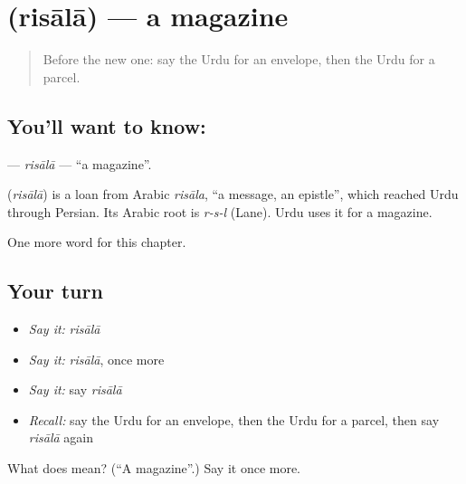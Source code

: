 \section[\texorpdfstring{\ur{رسالہ} (risālā)}{رسالہ (risālā)}]{ (risālā) — a magazine}

\label{lesson:UR-C225-risala}



\begin{quote}
Before the new one: say the Urdu for an envelope, then the Urdu for a parcel.
\end{quote}

\subsection*{You'll want to know: }
\textbf{} — \emph{risālā} — \textquotedblleft{}a magazine\textquotedblright{}.

\begin{cousinweb}
\textbf{} (\emph{risālā}) is a loan from Arabic \emph{risāla}, \textquotedblleft{}a message, an epistle\textquotedblright{}, which reached Urdu through Persian. Its Arabic root is \emph{r-s-l} (Lane). Urdu uses it for a magazine.
\end{cousinweb}

\begin{grammarlens}[title={What you've built}]
One more word for this chapter.
\end{grammarlens}

\subsection*{Your turn}
\begin{itemize}
\raggedright
  \item \emph{Say it:} \emph{risālā}
  \item \emph{Say it:} \emph{risālā}, once more
  \item \emph{Say it:} say \emph{risālā}
  \item \emph{Recall:} say the Urdu for an envelope, then the Urdu for a parcel, then say \emph{risālā} again
\end{itemize}

\begin{tcolorbox}[breakable,colback=teal!4,colframe=teal!35!black,title={Before you move on}]
What does  mean? (\textquotedblleft{}A magazine\textquotedblright{}.) Say it once more.
\end{tcolorbox}
